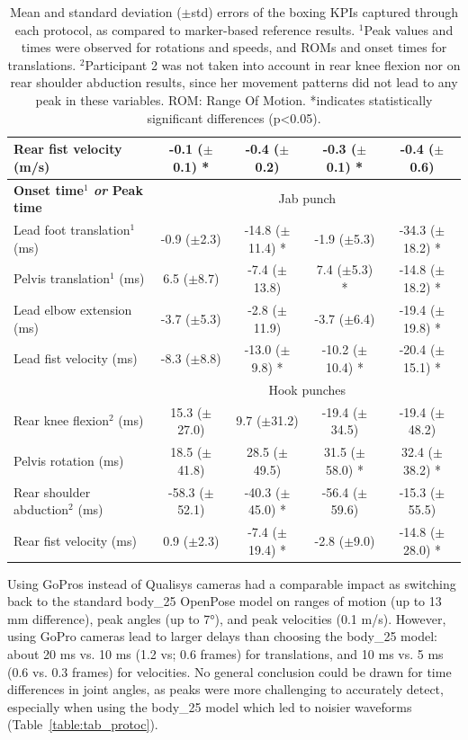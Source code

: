 \begin{table}[!ht]
{\begin{tabular}{lcccc}
          Rear fist velocity (m/s) & -0.1 ($\pm$0.1) * & -0.4 ($\pm$0.2) & -0.3 ($\pm$0.1) * & -0.4 ($\pm$0.6) \\
          \midrule
          \textbf{Onset time\(^1\) \emph{or} Peak time} & \multicolumn{4}{c}{Jab punch} \\
          \cmidrule(l{2pt}r{2pt}){2-5}
          Lead foot translation\(^1\) (ms) & -0.9 ($\pm$2.3) & -14.8 ($\pm$11.4) * & -1.9 ($\pm$5.3) & -34.3 ($\pm$18.2) * \\
          Pelvis translation\(^1\) (ms) & 6.5 ($\pm$8.7) & -7.4 ($\pm$13.8) & 7.4 ($\pm$5.3) * & -14.8 ($\pm$18.2) * \\
          Lead elbow extension (ms) & -3.7 ($\pm$5.3) & -2.8 ($\pm$11.9) & -3.7 ($\pm$6.4) & -19.4 ($\pm$19.8) * \\
          Lead fist velocity (ms)& -8.3 ($\pm$8.8) & -13.0 ($\pm$9.8) * & -10.2 ($\pm$10.4) * & -20.4 ($\pm$15.1) * \\
          \cmidrule(l{2pt}r{2pt}){2-5}
          ~ & \multicolumn{4}{c}{Hook punches} \\
          \cmidrule(l{2pt}r{2pt}){2-5}
          Rear knee flexion\(^2\) (ms) & 15.3 ($\pm$27.0) & 9.7 ($\pm$31.2) & -19.4 ($\pm$34.5) & -19.4 ($\pm$48.2) \\
          Pelvis rotation (ms) & 18.5 ($\pm$41.8) & 28.5 ($\pm$49.5) & 31.5 ($\pm$58.0) * & 32.4 ($\pm$38.2) * \\
          Rear shoulder abduction\(^2\) (ms) & -58.3 ($\pm$52.1) & -40.3 ($\pm$45.0) * & -56.4 ($\pm$59.6) & -15.3 ($\pm$55.5) \\
          Rear fist velocity (ms) & 0.9 ($\pm$2.3) & -7.4 ($\pm$19.4) * & -2.8 ($\pm$9.0) & -14.8 ($\pm$28.0) * \\
          \bottomrule
      \end{tabular}}
      \caption{Mean and standard deviation ($\pm$std) errors of the boxing KPIs captured through each protocol, as compared to marker-based reference results. \(^1\)Peak values and times were observed for rotations and speeds, and ROMs and onset times for translations. \(^2\)Participant 2 was not taken into account in rear knee flexion nor on rear shoulder abduction results, since her movement patterns did not lead to any peak in these variables.  ROM: Range Of Motion. *indicates statistically significant differences (p<0.05).}
      \label{table:tab_peakboxe}
\end{table}


Using GoPros instead of Qualisys cameras had a comparable impact as switching back to the standard body\_25 OpenPose model on ranges of motion (up to 13 mm difference), peak angles (up to 7°), and peak velocities (0.1 m/s). However, using GoPro cameras lead to larger delays than choosing the body\_25 model: about 20 ms vs. 10 ms (1.2 vs; 0.6 frames) for translations, and 10 ms vs. 5 ms (0.6 vs. 0.3 frames) for velocities. No general conclusion could be drawn for time differences in joint angles, as peaks were more challenging to accurately detect, especially when using the body\_25 model which led to noisier waveforms (Table~\ref{table:tab_protoc}).

